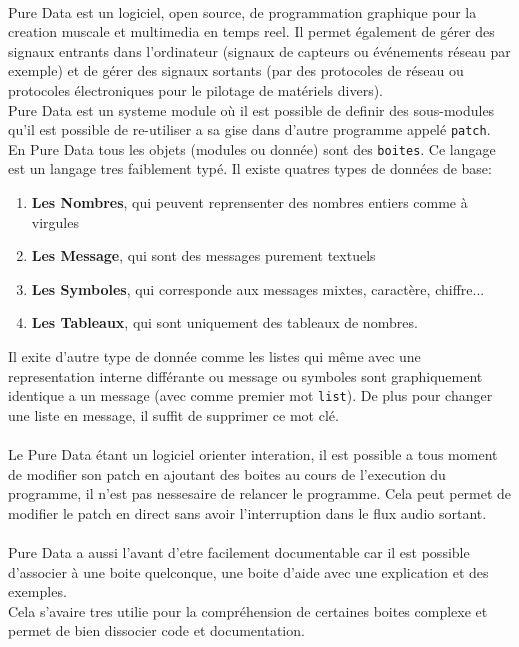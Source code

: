 \documentclass[a4paper, titlepage, oneside, 12pt]{article}%
\begin{document}
\paragraph{}
Pure Data est un logiciel, open source, de programmation graphique pour la creation muscale et multimedia en temps reel. Il permet également de gérer des signaux entrants dans l'ordinateur (signaux de capteurs ou événements réseau par exemple) et de gérer des signaux sortants (par des protocoles de réseau ou protocoles électroniques pour le pilotage de matériels divers).\\
Pure Data est un systeme module où il est possible de definir des sous-modules qu'il est possible de re-utiliser a sa gise dans d'autre programme appelé \texttt{patch}.
En Pure Data tous les objets (modules ou donnée) sont des \texttt{boites}.
Ce langage est un langage tres faiblement typé. Il existe quatres types de données de base:\\
\begin{enumerate}
\item \textbf{Les Nombres}, qui peuvent reprensenter des nombres entiers comme à virgules
\item \textbf{Les Message}, qui sont des messages purement textuels 
\item \textbf{Les Symboles}, qui corresponde aux messages mixtes, caractère, chiffre...
\item \textbf{Les Tableaux}, qui sont uniquement des tableaux de nombres.
\end{enumerate}
Il exite d'autre type de donnée comme les listes qui même avec une representation interne différante ou message ou symboles sont graphiquement identique a un message (avec comme premier mot \texttt{list}). De plus pour changer une liste en message, il suffit de supprimer ce mot clé.

\paragraph{}
Le Pure Data étant un logiciel orienter interation, il est possible a tous moment de modifier son patch en ajoutant des boites au cours de l'execution du programme, il n'est pas nessesaire de relancer le programme. Cela peut permet de modifier le patch en direct sans avoir l’interruption dans le flux audio sortant.

\paragraph{}
Pure Data a aussi l'avant d'etre facilement documentable car il est possible d'associer à une boite quelconque, une boite d'aide avec une explication et des exemples.\\
Cela s'avaire tres utilie pour la compréhension de certaines boites complexe et permet de bien dissocier code et documentation.
\end{document}
